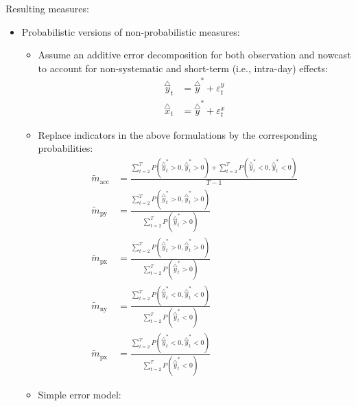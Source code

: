 \documentclass[oneside]{article}
\theoremstyle{plain}%
\theoremstyle{definition}
\newcommand{\ind}[1]{\mathbbm{1}\{#1\}}
\newcommand{\ydiff}{\overset{\triangle}{y}}
\newcommand{\ydifft}{\overset{\triangle}{y}^*}
\newcommand{\xdiff}{\overset{\triangle}{x}}
\newcommand{\xdifft}{\overset{\triangle}{y}^*}
\newcommand{\Prob}[1]{P(#1)}
\newcommand{\mprob}{\tilde{m}}
\begin{document}
Resulting measures:
\begin{itemize}

\item Probabilistic versions of non-probabilistic measures:
\begin{itemize}
  \item Assume an additive error decomposition for both observation and nowcast to account for non-systematic and short-term (i.e., intra-day) effects:
  	\begin{align}
  		\ydiff_t &= \ydifft + \varepsilon_t^y \\
  		\xdiff_t &= \xdifft + \varepsilon_t^x
	\end{align}
\item  Replace indicators in the above formulations by the corresponding probabilities:
\begin{align}
		\mprob_{\text{acc}} &= \frac{\sum_{t=2}^T \Prob{ \ydifft_t > 0, \xdifft_t > 0} + \sum_{t=2}^T \Prob{\ydifft_t < 0, \xdifft_t < 0}}{T-1}  \\
   \mprob_{\text{py}} &= \frac{\sum_{t=2}^T \Prob{\ydifft_t > 0, \xdifft_t > 0}}{\sum_{t=2}^T \Prob{\ydifft_t > 0}} \\
    \mprob_{\text{px}} &= \frac{\sum_{t=2}^T \Prob{\ydifft_t > 0, \xdifft_t > 0}}{\sum_{t=2}^T \Prob{\xdifft_t > 0}} \\
    \mprob_{\text{ny}} &= \frac{\sum_{t=2}^T \Prob{\ydifft_t < 0, \xdifft_t < 0}}{\sum_{t=2}^T \Prob{\ydifft_t < 0}} \\
    \mprob_{\text{px}} &= \frac{\sum_{t=2}^T \Prob{\ydifft_t < 0, \xdifft_t < 0}}{\sum_{t=2}^T \Prob{\xdifft_t < 0}} 
\end{align}
\item Simple error model:

\end{itemize}
\end{itemize}
\end{document}
